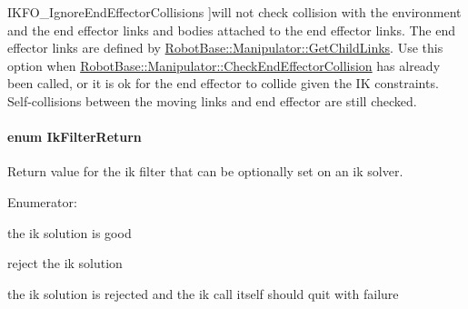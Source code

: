 \begin{Desc}
\begin{description}
{\hypertarget{namespaceOpenRAVE_a89401ff7c557d6d1ede96b550fb22bdcab6c6760e71911d36d392c861002e2a6c}{
IKFO\_\-IgnoreEndEffectorCollisions}
\label{namespaceOpenRAVE_a89401ff7c557d6d1ede96b550fb22bdcab6c6760e71911d36d392c861002e2a6c}
}]will not check collision with the environment and the end effector links and bodies attached to the end effector links. The end effector links are defined by \hyperlink{classOpenRAVE_1_1RobotBase_1_1Manipulator_a235e6b3b9b27422cdf11846a71f5ca66}{RobotBase::Manipulator::GetChildLinks}. Use this option when \hyperlink{classOpenRAVE_1_1RobotBase_1_1Manipulator_a409973001a95f36e715c2f227fd28c5a}{RobotBase::Manipulator::CheckEndEffectorCollision} has already been called, or it is ok for the end effector to collide given the IK constraints. Self-\/collisions between the moving links and end effector are still checked. \end{description}
\end{Desc}

\hypertarget{namespaceOpenRAVE_a7a8cf38163621e225d83b4b3a8ff62e9}{
\paragraph[{IkFilterReturn}]{\setlength{\rightskip}{0pt plus 5cm}enum {\bf IkFilterReturn}}\hfill}
\label{namespaceOpenRAVE_a7a8cf38163621e225d83b4b3a8ff62e9}


Return value for the ik filter that can be optionally set on an ik solver. 

\begin{Desc}
\item[Enumerator: ]\par
\begin{description}
\item[{\em 
\hypertarget{namespaceOpenRAVE_a7a8cf38163621e225d83b4b3a8ff62e9a7a0f5642b1a33ef86868e24bb1e2ea39}{
IKFR\_\-Success}
\label{namespaceOpenRAVE_a7a8cf38163621e225d83b4b3a8ff62e9a7a0f5642b1a33ef86868e24bb1e2ea39}
}]the ik solution is good \item[{\em 
\hypertarget{namespaceOpenRAVE_a7a8cf38163621e225d83b4b3a8ff62e9ae0a9b98b94852a81354da20c4c388929}{
IKFR\_\-Reject}
\label{namespaceOpenRAVE_a7a8cf38163621e225d83b4b3a8ff62e9ae0a9b98b94852a81354da20c4c388929}
}]reject the ik solution \item[{\em 
\hypertarget{namespaceOpenRAVE_a7a8cf38163621e225d83b4b3a8ff62e9a818a27efa66560252c93cc569caae79e}{
IKFR\_\-Quit}
\label{namespaceOpenRAVE_a7a8cf38163621e225d83b4b3a8ff62e9a818a27efa66560252c93cc569caae79e}
}]the ik solution is rejected and the ik call itself should quit with failure \end{description}
\end{Desc}

